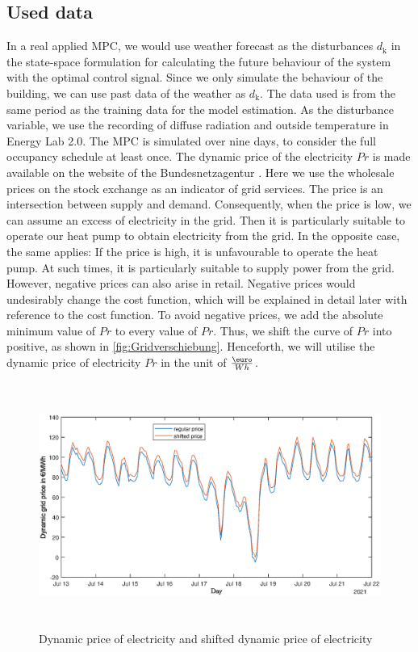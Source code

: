 \subsection{Used data}
\label{subsec:PastData}
    In a real applied MPC, we would use weather forecast as the disturbances $d_\text{k}$ in the state-space formulation for calculating the future behaviour of the system with the optimal control signal. Since we only simulate the behaviour of the building, we can use past data of the weather as $d_\text{k}$.\newline
    The data used is from the same period as the training data for the model estimation. As the disturbance variable, we use the recording of diffuse radiation and outside temperature in Energy Lab 2.0. The MPC is simulated over nine days, to consider the full occupancy schedule at least once.\newline
    The dynamic price of the electricity  $Pr$ is made available on the website of the Bundesnetzagentur \cite{Bundesnetzagentur-smard}. Here we use the wholesale prices on the stock exchange as an indicator of grid services. The price is an intersection between supply and demand. Consequently, when the price is low, we can assume an excess of electricity in the grid. Then it is particularly suitable to operate our heat pump to obtain electricity from the grid. In the opposite case, the same applies: If the price is high, it is unfavourable to operate the heat pump. At such times, it is particularly suitable to supply power from the grid. \newline
    However, negative prices can also arise in retail. Negative prices would undesirably change the cost function, which will be explained in detail later with reference to the cost function. To avoid negative prices, we add the absolute minimum value of $Pr$ to every value of $Pr$. Thus, we shift the curve of $Pr$ into positive, as shown in \autoref{fig:Gridverschiebung}. Henceforth, we will utilise the dynamic price of electricity $Pr$ in the unit of $\frac{\text{\euro}}{Wh}$.
    \begin{figure}[h]
            \centering
            \includegraphics[width=15cm,height=8cm]{figure/Grid_data_Verschiebung.eps}
           \caption{Dynamic price of electricity \cite{Bundesnetzagentur-smard} and shifted dynamic price of electricity}
            \label{fig:Gridverschiebung}
    \end{figure}
    
